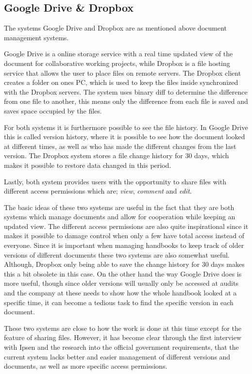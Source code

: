 \subsection{Google Drive \& Dropbox}\label{sec:DropDrive}
The systems Google Drive and Dropbox are as mentioned above document management systems.

Google Drive is a online storage service with a real time updated view of the document for collaborative working projects, while Dropbox is a file hosting service that allows the user to place files on remote servers.
The Dropbox client creates a folder on ones PC, which is used to keep the files inside synchronized with the Dropbox servers. 
The system uses binary diff to determine the difference from one file to another, this means only the difference from each file is saved and saves space occupied by the files\cite{DropboxDiff}.

For both systems it is furthermore possible to see the file history.
In Google Drive this is called version history, where it is possible to see how the document looked at different times, as well as who has made the different changes from the last version.
The Dropbox system stores a file change history for 30 days, which makes it possible to restore data changed in this period.

Lastly, both system provides users with the opportunity to share files with different access permissions which are; \textit{view}, \textit{comment} and \textit{edit}.

The basic ideas of these two systems are useful in the fact that they are both systems which manage documents and allow for cooperation while keeping an updated view.
The different access permissions are also quite inspirational since it makes it possible to damage control when only a few have total access instead of everyone.
Since it is important when managing handbooks to keep track of older versions of different documents these two systems are also somewhat useful.
Although, Dropbox only being able to save the change history for 30 days makes this a bit obsolete in this case.
On the other hand the way Google Drive does is more useful, though since older versions will usually only be accessed at audits and the company at these needs to show how the whole handbook looked at a specific time, it can become a tedious task to find the specific version in each document.

These two systems are close to how the work is done at this time except for the feature of sharing files.
However, it has become clear through the first interview with Ipsen and the research into the official government requirements, that the current system lacks better and easier management of different versions and documents, as well as more specific access permissions. 
